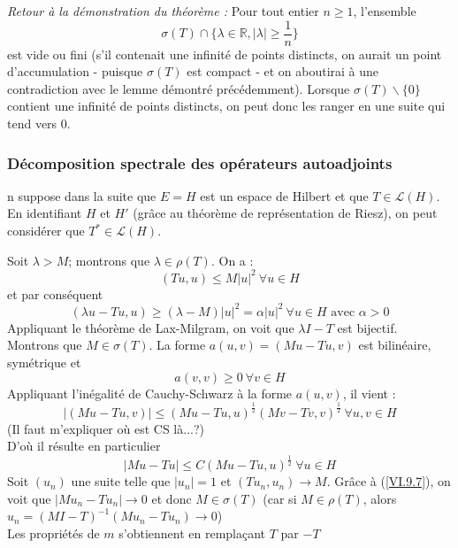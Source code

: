\begin{dem}
\begin{enumerate}
\bigskip
\textit{Retour à la démonstration du théorème :} Pour tout entier $n\geq 1$, l'ensemble \[\sigma(T)\cap\{\lambda\in\mathbb{R}, |\lambda|\geq\frac{1}{n}\}\]
est vide ou fini (s'il contenait une infinité de points distincts, on aurait un point d'accumulation - puisque $\sigma(T)$ est compact - et on aboutirai à une contradiction avec le lemme démontré précédemment). Lorsque $\sigma(T)\backslash\{0\}$ contient une infinité de points distincts, on peut donc les ranger en une suite qui tend vers $0$.
\end{enumerate}
\end{dem}

\subsubsection{Décomposition spectrale des opérateurs autoadjoints}
n suppose dans la suite que $E=H$ est un espace de Hilbert et que $T\in\mathscr{L}(H)$. En identifiant $H$ et $H'$ (grâce au théorème de représentation de Riesz), on peut considérer que $T^*\in\mathscr{L}(H)$.



\begin{dem}
Soit $\lambda>M$; montrons que $\lambda\in\rho(T)$. On a : \[(Tu,u)\leq M|u|^2\ \forall u\in H\]
et par conséquent \[(\lambda u-Tu,u)\geq (\lambda-M)|u|^2=\alpha|u|^2\ \forall u\in H \text{ avec } \alpha>0\]
Appliquant le théorème de Lax-Milgram, on voit que $\lambda I-T$ est bijectif.\\
Montrons que $M\in\sigma(T)$. La forme $a(u,v)=(Mu-Tu,v)$ est bilinéaire, symétrique et \[a(v,v)\geq 0\ \forall v\in H\]
Appliquant l'inégalité de Cauchy-Schwarz à la forme $a(u,v)$, il vient : \[|(Mu-Tu,v)|\leq (Mu-Tu,u)^{\frac{1}{2}}(Mv-Tv,v)^\frac{1}{2}\ \forall u,v\in H\] (Il faut m'expliquer où est CS là...?)\\
D'où il résulte en particulier \begin{equation}\label{VI.9.7} |Mu-Tu|\leq C(Mu-Tu,u)^\frac{1}{2}\ \forall u\in H \end{equation}
Soit $(u_n)$ une suite telle que $|u_n|=1$ et $(Tu_n,u_n)\to M$. Grâce à (\ref{VI.9.7}), on voit que $|Mu_n-Tu_n|\to 0$ et donc $M\in\sigma(T)$ (car si $M\in\rho(T)$, alors $u_n=(MI-T)^{-1}(Mu_n-Tu_n)\to 0$)\\
Les propriétés de $m$ s'obtiennent en remplaçant $T$ par $-T$
\end{dem}

